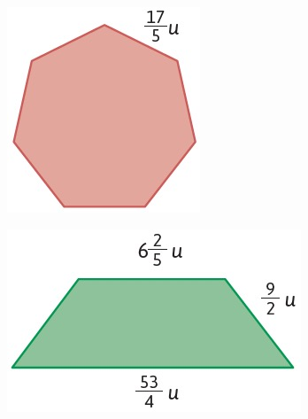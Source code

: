 \documentclass[11pt]{book}
\begin{document}
\begin{enumerate}
        \begin{minipage}{\textwidth}
          \begin{minipage}[t]{0.3\textwidth}
            \begin{figure}[H]
              \centering
              \includegraphics[width=.8\linewidth]{03.jpg}
            \end{figure}
          \end{minipage}%
          \begin{minipage}[t]{0.4\textwidth}
            \begin{figure}[H]
              \centering
              \includegraphics[width=.8\linewidth]{04.jpg}
            \end{figure}
          \end{minipage}%
          \begin{minipage}[t]{0.3\textwidth}
            \begin{figure}[H]

\end{figure}
\end{minipage}
\end{minipage}
\end{enumerate}
\end{document}
